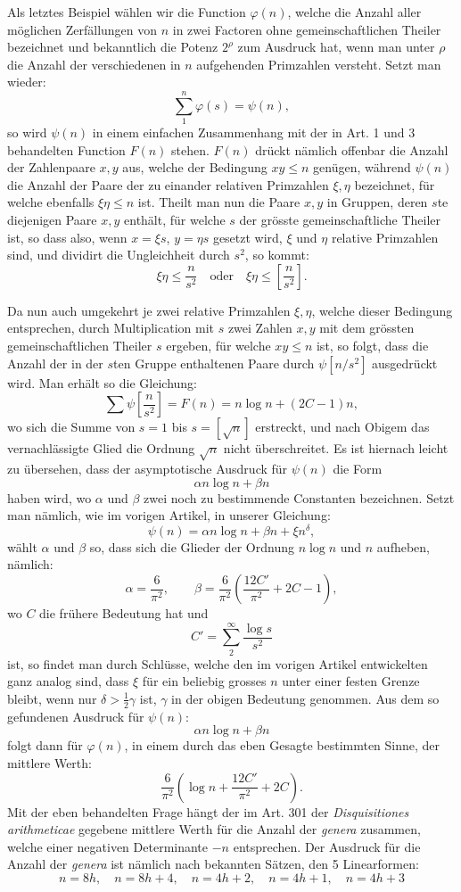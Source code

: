 \documentclass[11pt]{article}
\newcommand{\floor}[1]{\left[#1\right]}
\begin{document}
Als letztes Beispiel wählen wir die Function $\varphi(n)$, welche die Anzahl aller möglichen Zerfällungen von $n$ in zwei Factoren ohne gemeinschaftlichen Theiler bezeichnet und bekanntlich die Potenz $2^\rho$ zum Ausdruck hat, wenn man unter $\rho$ die Anzahl der verschiedenen in $n$ aufgehenden Primzahlen versteht. Setzt man wieder:
\[
 \sum_{1}^{n}\varphi(s)=\psi(n),
\]
so wird $\psi(n)$ in einem einfachen Zusammenhang mit der in Art. 1 und 3 behandelten Function $F(n)$ stehen. $F(n)$ drückt nämlich offenbar die Anzahl der Zahlenpaare $x,y$ aus, welche der Bedingung $xy\leq n$ genügen, während $\psi(n)$ die Anzahl der Paare der zu einander relativen Primzahlen $\xi,\eta$ bezeichnet, für welche ebenfalls $\xi\eta\leq n$ ist. Theilt man nun die Paare $x,y$ in Gruppen, deren $s$te diejenigen Paare $x,y$ enthält, für welche $s$ der grösste gemeinschaftliche Theiler ist, so dass also, wenn $x=\xi s$, $y=\eta s$ gesetzt wird, $\xi$ und $\eta$ relative Primzahlen sind, und dividirt die Ungleichheit durch $s^2$, so kommt:
\[
 \xi\eta\leq\frac n{s^2}\quad \text{oder}\quad
 \xi\eta\leq\floor{\frac n{s^2}}.
\]

Da nun auch umgekehrt je zwei relative Primzahlen $\xi,\eta$, welche dieser Bedingung entsprechen, durch Multiplication mit $s$ zwei Zahlen $x,y$ mit dem grössten gemeinschaftlichen Theiler $s$ ergeben, für welche $xy\leq n$ ist, so folgt, dass die Anzahl der in der $s$ten Gruppe enthaltenen Paare durch $\psi\floor{n/s^2}$ ausgedrückt wird. Man erhält so die Gleichung:
\[
 \sum \psi\floor{\frac n{s^2}}=F(n)=n\log n+(2C-1)n,
\]
wo sich die Summe von $s=1$ bis $s=\floor{\sqrt n}$ erstreckt, und nach Obigem das vernachlässigte Glied die Ordnung $\sqrt n$ nicht überschreitet. Es ist hiernach leicht zu übersehen, dass der asymptotische Ausdruck für $\psi(n)$ die Form
\[
 \alpha n\log n+\beta n
\]
haben wird, wo $\alpha$ und $\beta$ zwei noch zu bestimmende Constanten bezeichnen. Setzt man nämlich, wie im vorigen Artikel, in unserer Gleichung:
\[
 \psi(n)=\alpha n\log n+\beta n+\xi n^\delta,
\]
wählt $\alpha$ und $\beta$ so, dass sich die Glieder der Ordnung $n\log n$ und $n$ aufheben, nämlich:
\[
 \alpha=\frac6{\pi^2},
 \qquad
 \beta=\frac6{\pi^2}\left(\frac{12C'}{\pi^2}+2C-1\right),
\]
wo $C$ die frühere Bedeutung hat und
\[
 C'=\sum_{2}^{\infty}\frac{\log s}{s^2}
\]
ist, so findet man durch Schlüsse, welche den im vorigen Artikel entwickelten ganz analog sind, dass $\xi$ für ein beliebig grosses $n$ unter einer festen Grenze bleibt, wenn nur $\delta>\frac12\gamma$ ist, $\gamma$ in der obigen Bedeutung genommen. Aus dem so gefundenen Ausdruck für $\psi(n)$:
\[
 \alpha n\log n+\beta n
\]
folgt dann für $\varphi(n)$, in einem durch das eben Gesagte bestimmten Sinne, der mittlere Werth:
\[
 \frac6{\pi^2}\left(\log n+\frac{12C'}{\pi^2}+2C\right).
\]
Mit der eben behandelten Frage hängt der im Art. 301 der \emph{Disquisitiones arithmeticae} gegebene mittlere Werth für die Anzahl der \emph{genera} zusammen, welche einer negativen Determinante $-n$ entsprechen. Der Ausdruck für die Anzahl der \emph{genera} ist nämlich nach bekannten Sätzen, den 5 Linearformen:
\[
 n=8h,\quad n=8h+4,\quad n=4h+2,\quad n=4h+1,\quad n=4h+3
\]
\end{document}
